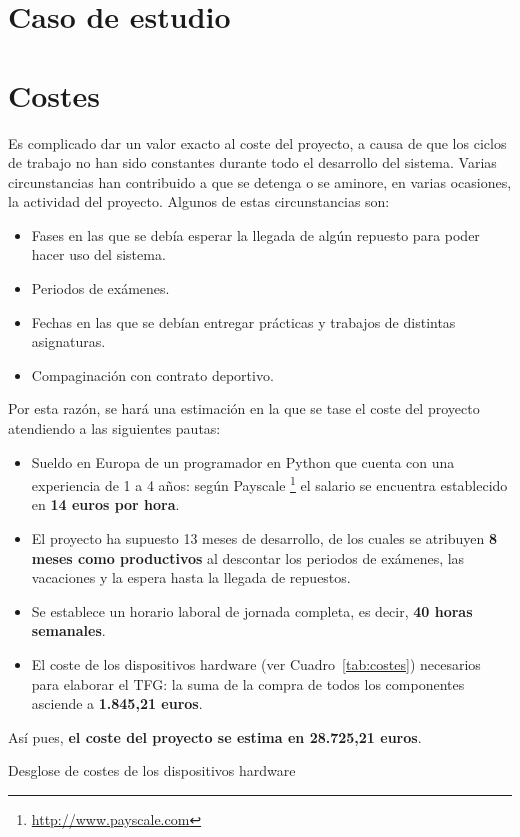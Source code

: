 \section{Caso de estudio}

\section{Costes}

Es complicado dar un valor exacto al coste del proyecto, a causa de que los ciclos de trabajo no han sido constantes durante todo el desarrollo del sistema. Varias circunstancias han contribuido a que se detenga o se aminore, en varias ocasiones, la actividad del proyecto. Algunos de estas circunstancias son:

\begin{itemize}
\item Fases en las que se debía esperar la llegada de algún repuesto para poder hacer uso del sistema.
\item Periodos de exámenes.
\item Fechas en las que se debían entregar prácticas y trabajos de distintas asignaturas.
\item Compaginación con contrato deportivo.
\end{itemize}  

Por esta razón, se hará una estimación en la que se tase el coste del proyecto atendiendo a las siguientes pautas:

\begin{itemize}
\item Sueldo en Europa de un programador en Python que cuenta con una experiencia de 1 a 4 años: según Payscale \footnote{\url{http://www.payscale.com}} el salario se encuentra establecido en \textbf{14 euros por hora}.
\item El proyecto ha supuesto 13 meses de desarrollo, de los cuales se atribuyen \textbf{8 meses como productivos} al descontar los periodos de exámenes, las vacaciones y la espera hasta la llegada de repuestos.
\item Se establece un horario laboral de jornada completa, es decir, \textbf{40 horas semanales}.
\item El coste de los dispositivos hardware (ver Cuadro~\ref{tab:costes}) necesarios para elaborar el \acs{TFG}: la suma de la compra de todos los componentes asciende a \textbf{1.845,21 euros}.
\end{itemize}

Así pues, \textbf{el coste del proyecto se estima en 28.725,21 euros}.

\begin{table}[!h]
 \centering
 {\small
 
 }
 \caption[Desglose de costes de los dispositivos hardware]
 {Desglose de costes de los dispositivos hardware}
 \label{tab:costes}
\end{table}



